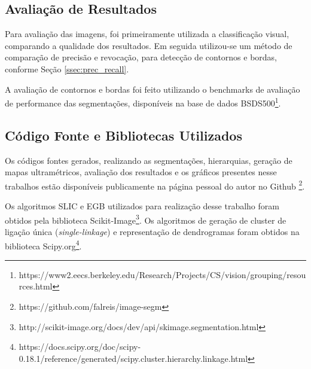 \begin{document}

\subsection{Avaliação de Resultados} \label{ssec:aval_resultados}

Para avaliação das imagens, foi primeiramente utilizada a classificação visual, comparando a qualidade dos resultados. Em seguida utilizou-se um método de comparação de precisão e revocação, para detecção de contornos e bordas, conforme Seção \ref{ssec:prec_recall}. 

A avaliação de contornos e bordas foi feito utilizando o benchmarks de avaliação de performance das segmentações, disponíveis na base de dados BSDS500\footnote{https://www2.eecs.berkeley.edu/Research/Projects/CS/vision/grouping/resources.html}.



\subsection{Código Fonte e Bibliotecas Utilizados} \label{ssec:cod_fonte}

Os códigos fontes gerados, realizando as segmentações, hierarquias, geração de mapas ultramétricos, avaliação dos resultados e os gráficos presentes nesse trabalhos estão disponíveis publicamente na página pessoal do autor no Github \footnote{https://github.com/falreis/image-segm}.

Os algoritmos SLIC e EGB utilizados para realização desse trabalho foram obtidos pela biblioteca Scikit-Image\footnote{http://scikit-image.org/docs/dev/api/skimage.segmentation.html}. 
Os algoritmos de geração de cluster de ligação única (\textit{single-linkage}) e representação de dendrogramas foram obtidos na biblioteca Scipy.org\footnote{https://docs.scipy.org/doc/scipy-0.18.1/reference/generated/scipy.cluster.hierarchy.linkage.html}. 



\end{document}
